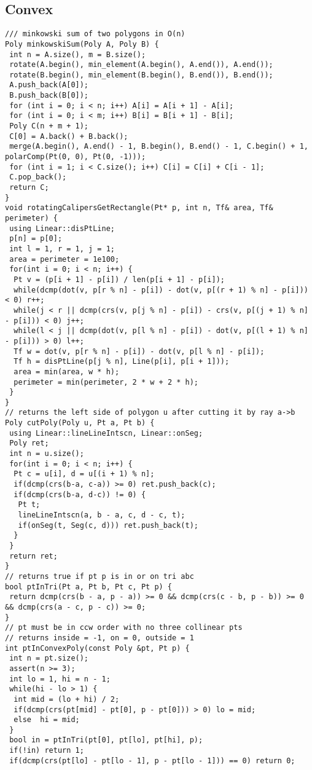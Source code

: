 \documentclass[a4paper,11pt,oneside]{article}
\begin{document}
\begin{multicols*}{\COLS}
\subsection{Convex}
\begin{lstlisting}
/// minkowski sum of two polygons in O(n)
Poly minkowskiSum(Poly A, Poly B) {
 int n = A.size(), m = B.size();
 rotate(A.begin(), min_element(A.begin(), A.end()), A.end());
 rotate(B.begin(), min_element(B.begin(), B.end()), B.end());
 A.push_back(A[0]);
 B.push_back(B[0]);
 for (int i = 0; i < n; i++) A[i] = A[i + 1] - A[i];
 for (int i = 0; i < m; i++) B[i] = B[i + 1] - B[i];
 Poly C(n + m + 1);
 C[0] = A.back() + B.back();
 merge(A.begin(), A.end() - 1, B.begin(), B.end() - 1, C.begin() + 1, polarComp(Pt(0, 0), Pt(0, -1)));
 for (int i = 1; i < C.size(); i++) C[i] = C[i] + C[i - 1];
 C.pop_back();
 return C;
}
void rotatingCalipersGetRectangle(Pt* p, int n, Tf& area, Tf& perimeter) {
 using Linear::disPtLine;
 p[n] = p[0];
 int l = 1, r = 1, j = 1;
 area = perimeter = 1e100;
 for(int i = 0; i < n; i++) {
  Pt v = (p[i + 1] - p[i]) / len(p[i + 1] - p[i]);
  while(dcmp(dot(v, p[r % n] - p[i]) - dot(v, p[(r + 1) % n] - p[i])) < 0) r++;
  while(j < r || dcmp(crs(v, p[j % n] - p[i]) - crs(v, p[(j + 1) % n] - p[i])) < 0) j++;
  while(l < j || dcmp(dot(v, p[l % n] - p[i]) - dot(v, p[(l + 1) % n] - p[i])) > 0) l++;
  Tf w = dot(v, p[r % n] - p[i]) - dot(v, p[l % n] - p[i]);
  Tf h = disPtLine(p[j % n], Line(p[i], p[i + 1]));
  area = min(area, w * h);
  perimeter = min(perimeter, 2 * w + 2 * h);
 }
}
// returns the left side of polygon u after cutting it by ray a->b
Poly cutPoly(Poly u, Pt a, Pt b) {
 using Linear::lineLineIntscn, Linear::onSeg;
 Poly ret;
 int n = u.size();
 for(int i = 0; i < n; i++) {
  Pt c = u[i], d = u[(i + 1) % n];
  if(dcmp(crs(b-a, c-a)) >= 0) ret.push_back(c);
  if(dcmp(crs(b-a, d-c)) != 0) {
   Pt t;
   lineLineIntscn(a, b - a, c, d - c, t);
   if(onSeg(t, Seg(c, d))) ret.push_back(t);
  }
 }
 return ret;
}
// returns true if pt p is in or on tri abc
bool ptInTri(Pt a, Pt b, Pt c, Pt p) {
 return dcmp(crs(b - a, p - a)) >= 0 && dcmp(crs(c - b, p - b)) >= 0 && dcmp(crs(a - c, p - c)) >= 0;
}
// pt must be in ccw order with no three collinear pts
// returns inside = -1, on = 0, outside = 1
int ptInConvexPoly(const Poly &pt, Pt p) {
 int n = pt.size();
 assert(n >= 3);
 int lo = 1, hi = n - 1;
 while(hi - lo > 1) {
  int mid = (lo + hi) / 2;
  if(dcmp(crs(pt[mid] - pt[0], p - pt[0])) > 0) lo = mid;
  else  hi = mid;
 }
 bool in = ptInTri(pt[0], pt[lo], pt[hi], p);
 if(!in) return 1;
 if(dcmp(crs(pt[lo] - pt[lo - 1], p - pt[lo - 1])) == 0) return 0;

\end{lstlisting}
\end{multicols*}
\end{document}
